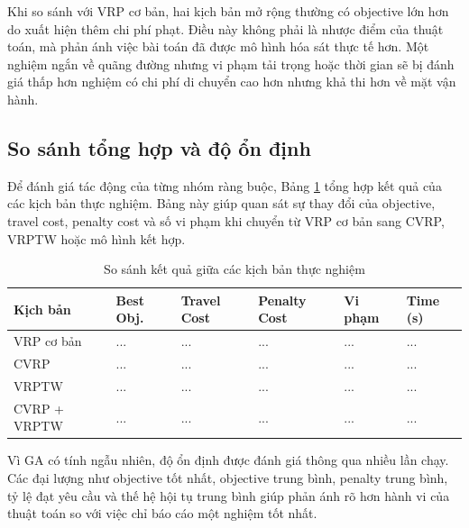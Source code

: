 \documentclass[12pt,a4paper]{article}
\numberwithin{figure}{subsection}
\numberwithin{table}{subsection}
\begin{document}
Khi so sánh với VRP cơ bản, hai kịch bản mở rộng thường có objective lớn hơn do xuất hiện thêm chi phí phạt. Điều này không phải là nhược điểm của thuật toán, mà phản ánh việc bài toán đã được mô hình hóa sát thực tế hơn. Một nghiệm ngắn về quãng đường nhưng vi phạm tải trọng hoặc thời gian sẽ bị đánh giá thấp hơn nghiệm có chi phí di chuyển cao hơn nhưng khả thi hơn về mặt vận hành.

\subsection{So sánh tổng hợp và độ ổn định}

Để đánh giá tác động của từng nhóm ràng buộc, Bảng \ref{tab:scenario_comparison} tổng hợp kết quả của các kịch bản thực nghiệm. Bảng này giúp quan sát sự thay đổi của objective, travel cost, penalty cost và số vi phạm khi chuyển từ VRP cơ bản sang CVRP, VRPTW hoặc mô hình kết hợp.

\begin{table}[htbp]
    \centering
    \caption{So sánh kết quả giữa các kịch bản thực nghiệm}
    \label{tab:scenario_comparison}
    \renewcommand{\arraystretch}{1.28}
    \small
    \begin{tabular}{|p{2.8cm}|p{2.2cm}|p{2.2cm}|p{2.2cm}|p{1.7cm}|p{1.7cm}|}
        \hline
        \textbf{Kịch bản} & \textbf{Best Obj.} & \textbf{Travel Cost} & \textbf{Penalty Cost} & \textbf{Vi phạm} & \textbf{Time (s)} \\
        \hline
        VRP cơ bản & ... & ... & ... & ... & ... \\
        \hline
        CVRP & ... & ... & ... & ... & ... \\
        \hline
        VRPTW & ... & ... & ... & ... & ... \\
        \hline
        CVRP + VRPTW & ... & ... & ... & ... & ... \\
        \hline
    \end{tabular}
\end{table}

Vì GA có tính ngẫu nhiên, độ ổn định được đánh giá thông qua nhiều lần chạy. Các đại lượng như objective tốt nhất, objective trung bình, penalty trung bình, tỷ lệ đạt yêu cầu và thế hệ hội tụ trung bình giúp phản ánh rõ hơn hành vi của thuật toán so với việc chỉ báo cáo một nghiệm tốt nhất.
\end{document}
